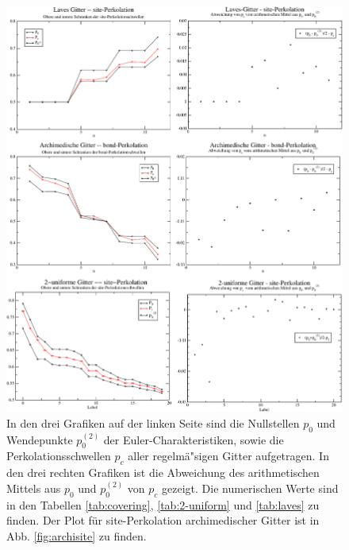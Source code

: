 \begin{figure}[htbp]
  \centering
  \includegraphics[width=16cm]{./Schranken-figs/2dallplots}
  \caption{In den drei Grafiken auf der linken Seite sind die Nullstellen $p_0$ und Wendepunkte $p_0^{(2)}$ der Euler-Charakteristiken, sowie die Perkolationsschwellen $p_c$ aller regelm\"a"sigen Gitter aufgetragen. In den drei rechten Grafiken ist die Abweichung des arithmetischen Mittels aus $p_0$ und $p_0^{(2)}$ von $p_c$ gezeigt. Die numerischen Werte sind in den Tabellen \ref{tab:covering}, \ref{tab:2-uniform} und \ref{tab:laves} zu finden. Der Plot f\"ur site-Perkolation archimedischer Gitter ist in Abb. \ref{fig:archisite} zu finden.}
  \label{fig:2dallplots}
\end{figure}

